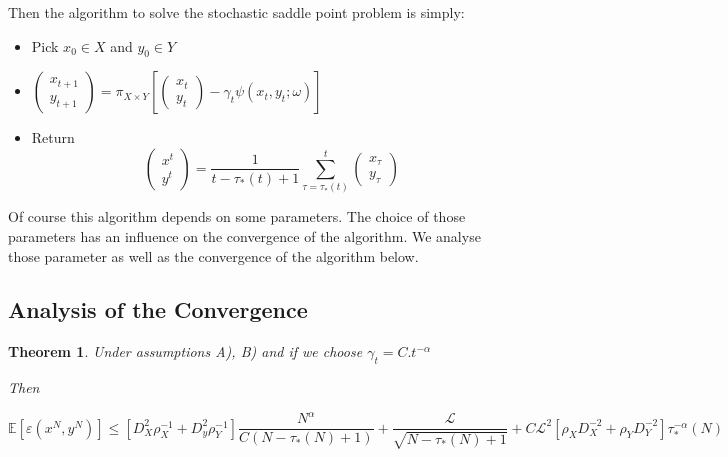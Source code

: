 \documentclass[12pt,reqno]{amsart}
\newtheorem{thm}{Theorem}[section]
\numberwithin{equation}{section}
\begin{document}
\vspace{0.5cm}

Then the algorithm to solve the stochastic saddle point problem is simply:

\vspace{0.5cm}




\begin{itemize}
\item Pick $x_{0} \in X$ and $y_{0} \in Y$
\item $\begin{pmatrix} x_{t+1} \\ y_{t+1} \end{pmatrix} = \pi_{X \times Y}[\begin{pmatrix} x_{t} \\ y_{t} \end{pmatrix} - \gamma_{t}\psi(x_{t},y_{t};\omega)]$
\item Return 
$$
\begin{pmatrix} x^{t} \\ y^{t} \end{pmatrix} = \dfrac{1}{t - \tau_{*}(t) + 1}\sum_{\tau = \tau_{*}(t)}^{t}\begin{pmatrix} x_{\tau} \\ y_{\tau} \end{pmatrix}
$$
\end{itemize}


Of course this algorithm depends on some parameters. The choice of those parameters has an influence on the convergence of the algorithm. We analyse those parameter as well as the convergence of the algorithm below.

\subsection{Analysis of the Convergence}

\begin{thm}

Under assumptions A), B) and if we choose $\gamma_{t} = C.t^{-\alpha}$

Then

$$
\mathbb{E}[\varepsilon(x^{N},y^{N})] \leq [D_{X}^{2}\rho_{X}^{-1} + D_{y}^{2}\rho_{Y}^{-1}]\dfrac{N^{\alpha}}{C(N - \tau_{*}(N) + 1)} +  \dfrac{\mathcal{L}}{\sqrt{N - \tau_{*}(N) + 1}}+ C\mathcal{L}^{2}[\rho_{X}D_{X}^{-2} + \rho_{Y}D_{Y}^{-2}]\tau_{*}^{-\alpha}(N)
$$

\end{thm}
\end{document}
